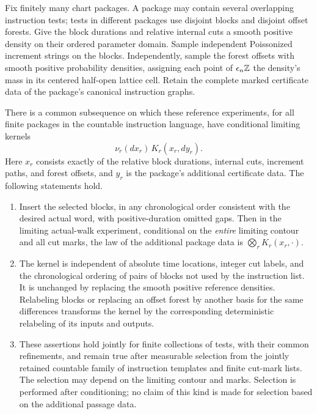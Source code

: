 \begin{lemma}
\label{tree:lem:finite_kernel_transfer}
Fix finitely many chart packages.  A package may contain several
overlapping instruction tests; tests in different packages use disjoint
blocks and disjoint offset forests.  Give the block durations and
relative internal cuts a smooth positive density on their ordered
parameter domain.  Sample independent Poissonized increment strings
on the blocks. Independently, sample the forest offsets with smooth
positive probability densities, assigning each point of
$\epsilon_n\mathbb Z$ the density's mass in its centered half-open lattice
cell. Retain the complete
marked certificate data of the package's canonical instruction graphs.

There is a common subsequence on which these reference experiments,
for all finite packages in the countable instruction language, have
conditional limiting kernels
\begin{equation}\label{tree:eq:reference_kernel}
 \nu_r(dx_r)\,K_r(x_r,dy_r).
\end{equation}
Here $x_r$ consists exactly of the relative block durations, internal
cuts, increment paths, and forest offsets, and $y_r$ is the package's
additional certificate data.  The following statements hold.
\begin{enumerate}
\item Insert the selected blocks, in any chronological order consistent
with the desired actual word, with positive-duration omitted gaps.
Then in the limiting actual-walk experiment, conditional on the
\emph{entire} limiting contour and all cut marks, the law of the
additional package data is $\bigotimes_r K_r(x_r,\cdot)$.
\item The kernel is independent of absolute time locations, integer
cut labels, and the chronological ordering of pairs of blocks not
used by the instruction list.  It is unchanged by replacing the
smooth positive reference densities.  Relabeling blocks or replacing
an offset forest by another basis for the same differences transforms
the kernel by the corresponding deterministic relabeling of its inputs
and outputs.
\item These assertions hold jointly for finite collections of tests,
with their common refinements, and remain true after measurable
selection from the jointly retained countable family of instruction
templates and finite cut-mark lists. The selection may depend on the
limiting contour and marks. Selection is
performed after conditioning; no claim of this kind is made for
selection based on the additional passage data.
\end{enumerate}
\end{lemma}

